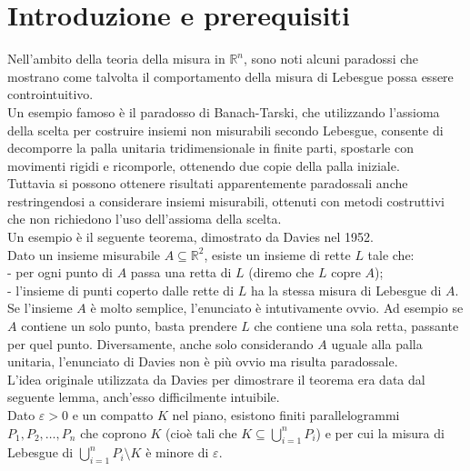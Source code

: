 \documentclass[a4paper, twoside,openright]{article}
\newcommand{\R}{\mathbb{R}}
\newcommand{\e}{\varepsilon}
\newcommand{\<}{\langle}
\renewcommand{\>}{\rangle}
\begin{document}


\tableofcontents
\clearpage

\section{Introduzione e prerequisiti}
	
	Nell’ambito della teoria della misura in $\R^n$, sono noti alcuni paradossi che mostrano come talvolta il comportamento della misura di Lebesgue possa essere controintuitivo.\\
	Un esempio famoso è il paradosso di Banach-Tarski, che utilizzando l’assioma della scelta per costruire insiemi non misurabili secondo Lebesgue, consente di decomporre la palla unitaria tridimensionale in finite parti, spostarle con movimenti rigidi e ricomporle, ottenendo due copie della palla iniziale.\\
	Tuttavia si possono ottenere risultati apparentemente paradossali anche restringendosi a considerare insiemi misurabili, ottenuti con metodi costruttivi che non richiedono l’uso dell’assioma della scelta.\\
	Un esempio è il seguente teorema, dimostrato da Davies nel 1952. \\
	Dato un insieme misurabile $A \subseteq \mathbb{R}^{2}$, esiste un insieme di rette $L$ tale che:\\
	- per ogni punto di $A$ passa una retta di $L$ (diremo che $L$ copre $A$);\\
	- l'insieme di punti coperto dalle rette di $L$ ha la stessa misura di Lebesgue di $A$.\\
	
	Se l’insieme $A$ è molto semplice, l’enunciato è intutivamente ovvio. Ad esempio se $A$ contiene un solo punto, basta prendere $L$ che contiene una sola retta, passante per quel punto. Diversamente, anche solo considerando $A$ uguale alla palla unitaria, l’enunciato di Davies non è più ovvio ma risulta paradossale. \\
	L’idea originale utilizzata da Davies per dimostrare il teorema era data dal seguente lemma, anch’esso difficilmente intuibile.\\
	Dato $\e >0$ e un compatto $K$ nel piano, esistono finiti parallelogrammi $P_1, P_2, …,P_n$ che coprono $K$ (cioè tali che $K \subseteq \bigcup_{i=1}^nP_i$) e per cui la misura di Lebesgue di $\bigcup_{i=1}^n P_i \setminus K$ è minore di $\e$. \\
	
\end{document}
